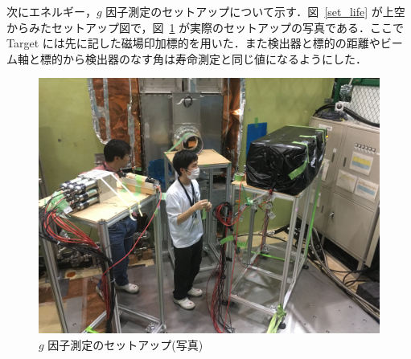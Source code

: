 次にエネルギー，$g$ 因子測定のセットアップについて示す．図~\ref{set_life} が上空からみたセットアップ図で，図~\ref{set_g_2} が実際のセットアップの写真である．ここでTarget には先に記した磁場印加標的を用いた．また検出器と標的の距離やビーム軸と標的から検出器のなす角は寿命測定と同じ値になるようにした．
\begin{figure}[H]
\centering
\includegraphics[width=1.1\textwidth]{figure/tajima/g.jpg}
\caption{$g$ 因子測定のセットアップ(写真)}
\label{set_g_2}
\end{figure}

